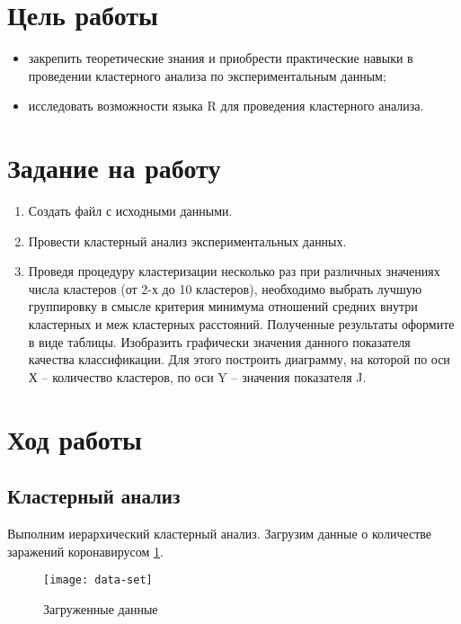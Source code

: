 \documentclass[a4paper,14pt]{extarticle}
\begin{document}


\section{Цель работы}
\begin{itemize}
    \item закрепить теоретические знания и приобрести практические навыки в
          проведении кластерного анализа по экспериментальным данным;
    \item исследовать возможности языка R для проведения кластерного анализа.
\end{itemize}

\section{Задание на работу}
\begin{enumerate}
    \item Создать файл с исходными данными.
    \item Провести кластерный анализ экспериментальных данных.
    \item Проведя процедуру кластеризации несколько раз при различных значениях
          числа кластеров (от 2-х до 10 кластеров), необходимо выбрать лучшую
          группировку в смысле критерия минимума отношений средних внутри
          кластерных и меж кластерных расстояний. Полученные результаты оформите
          в виде таблицы. Изобразить графически значения данного показателя
          качества классификации. Для этого построить диаграмму, на которой по
          оси Х – количество кластеров, по оси Y – значения показателя J.
\end{enumerate}

\section{Ход работы}
\subsection{Кластерный анализ}
Выполним иерархический кластерный анализ. Загрузим данные о количестве заражений
коронавирусом \ref{fig:data-set}.

\begin{figure}[H]
    \centering
    \texttt{[image: data-set]}
    \caption{Загруженные данные}
    \label{fig:data-set}
\end{figure}
\end{document}
